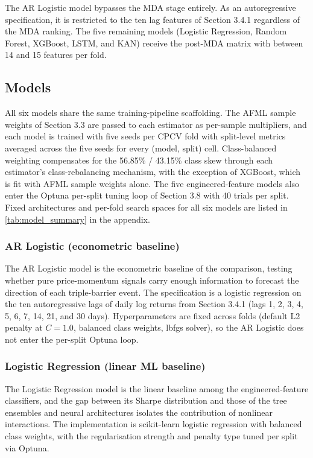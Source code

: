 The AR Logistic model bypasses the MDA stage entirely. As an autoregressive specification, it is restricted to the ten lag features of Section 3.4.1 regardless of the MDA ranking. The five remaining models (Logistic Regression, Random Forest, XGBoost, LSTM, and KAN) receive the post-MDA matrix with between 14 and 15 features per fold.


\subsection{Models}\label{subsec:models}

All six models share the same training-pipeline scaffolding. The AFML sample weights of Section 3.3 are passed to each estimator as per-sample multipliers, and each model is trained with five seeds per CPCV fold with split-level metrics averaged across the five seeds for every (model, split) cell. Class-balanced weighting compensates for the 56.85\% / 43.15\% class skew through each estimator's class-rebalancing mechanism, with the exception of XGBoost, which is fit with AFML sample weights alone. The five engineered-feature models also enter the Optuna per-split tuning loop of Section 3.8 with 40 trials per split. Fixed architectures and per-fold search spaces for all six models are listed in \label{ref:model_summary_call}\autoref{tab:model_summary} in the appendix.


\subsubsection{AR Logistic (econometric baseline)}\label{subsubsec:ar}

The AR Logistic model is the econometric baseline of the comparison, testing whether pure price-momentum signals carry enough information to forecast the direction of each triple-barrier event. The specification is a logistic regression on the ten autoregressive lags of daily log returns from Section 3.4.1 (lags 1, 2, 3, 4, 5, 6, 7, 14, 21, and 30 days). Hyperparameters are fixed across folds (default L2 penalty at $C = 1.0$, balanced class weights, lbfgs solver), so the AR Logistic does not enter the per-split Optuna loop.


\subsubsection{Logistic Regression (linear ML baseline)}\label{subsubsec:lr}

The Logistic Regression model is the linear baseline among the engineered-feature classifiers, and the gap between its Sharpe distribution and those of the tree ensembles and neural architectures isolates the contribution of nonlinear interactions. The implementation is scikit-learn logistic regression with balanced class weights, with the regularisation strength and penalty type tuned per split via Optuna.


